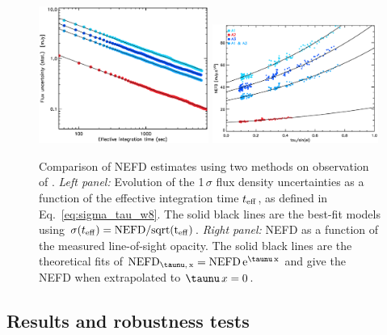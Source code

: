 \begin{figure}[!thbp]
  \begin{center}
    \includegraphics[trim={0.5cm, 0, 0, 0.5cm}, clip, angle=0, width=0.495\textwidth]{Figures/hls_nefd_vst.eps}
    \includegraphics[trim={0.5cm, 0, 0.2cm, 0.5cm}, clip, angle=0, width=0.485\textwidth]{Figures/hls_NEFD_vs_TauElev_all.eps}
    \caption{Comparison of NEFD estimates using two methods on observation of
      \hls. \emph{Left panel:} Evolution of the 1\,$\sigma$ flux density
      uncertainties as a function of the effective integration time
      $t_{\rm{eff}}$, as defined in Eq.~\ref{eq:sigma_tau_w8}. The solid black
      lines are the best-fit models using $\sigma(t_{\rm{eff}}) =
      \rm{NEFD}/sqrt(t_{\rm{eff}})$. \emph{Right panel:} NEFD as a function of the
    measured line-of-sight opacity. The solid black lines are the theoretical
    fits of $\rm{NEFD}_{\taunu,\, x } = \rm{NEFD}\, e^{\taunu\,x}$ and give the
    NEFD when extrapolated to $\taunu\,x = 0$. }
    \label{fig:nefd_twomethods}
  \end{center}
\end{figure}

\subsection{Results and robustness tests}
\label{se:nefd_results}

